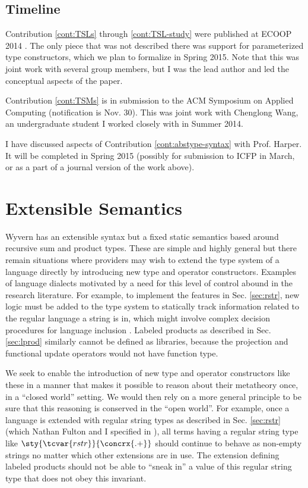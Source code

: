 \subsection{Timeline}
Contribution \ref{cont:TSLs} through \ref{cont:TSL-study} were published at ECOOP 2014 \cite{TSLs}. The only piece that was not described there was support for parameterized type constructors, which we plan to formalize in Spring 2015. Note that this was joint work with several group members, but I was the lead author and led the conceptual aspects of the paper.

Contribution \ref{cont:TSMs} is in submission to the ACM Symposium on Applied Computing (notification is Nov. 30). This was joint work with Chenglong Wang, an undergraduate student I worked closely with in Summer 2014.

I have discussed aspects of Contribution \ref{cont:abstype-syntax} with Prof. Harper. It will be completed in Spring 2015 (possibly for submission to ICFP in March, or as a part of a journal version of the work above).

\newpage

\section{Extensible Semantics}\label{sec:semantics}
Wyvern has an extensible syntax but a fixed static semantics based around recursive sum and product types. These are simple and highly general but there remain situations where providers may wish to extend the {type system} of a language directly by introducing new type and operator constructors. Examples of language dialects motivated by a need for this level of control abound in the research literature. For example, to implement the features in Sec. \ref{sec:rstr}, new logic must be added to the type system to statically track information related to the regular language a string is in, which might involve complex decision procedures for language inclusion \cite{sanitation-psp14}. Labeled products as described in Sec. \ref{sec:lprod} similarly cannot be defined as libraries, because the projection and functional update operators would not have function type.

We seek to enable the introduction of new type and operator constructors like these in a manner that makes it possible to reason about their metatheory once, in a ``closed world'' setting. We would then rely on a more general principle to be sure that this reasoning is conserved in the ``open world''. For example, once a language is extended with {regular string types} as described in Sec. \ref{sec:rstr} (which Nathan Fulton and I specified in \cite{sanitation-psp14}), all terms having a regular string type like $\sty{\tcvar{rstr}}{\concrx{.+}}$  should continue to behave as non-empty strings no matter which other extensions are in use. The extension defining labeled products should not be able to ``sneak in'' a value of this regular string type that does not obey this invariant.


